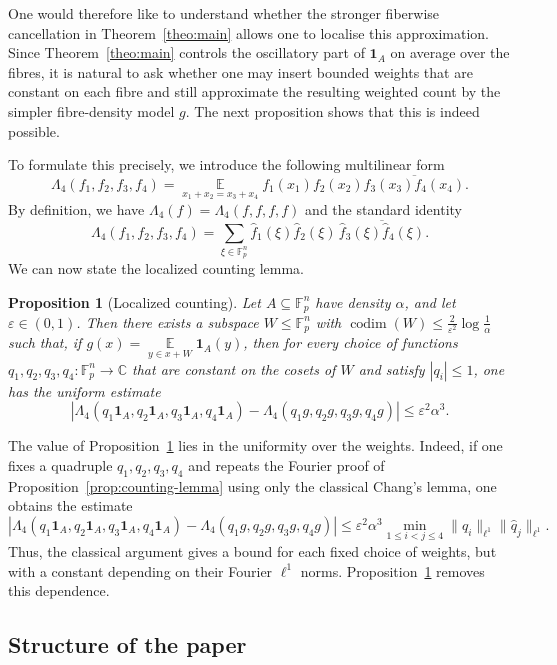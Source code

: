 \documentclass[11pt,reqno]{amsart}
\theoremstyle{plain}
\newtheorem{prop}[thm]{Proposition}
\theoremstyle{remark}
\begin{document}
One would therefore like to understand whether the stronger fiberwise cancellation in Theorem~\ref{theo:main} allows one to localise this approximation. Since Theorem~\ref{theo:main} controls the oscillatory part of $\mathbf 1_A$ on average over the fibres, it is natural to ask whether one may insert bounded weights that are constant on each fibre and still approximate the resulting weighted count by the simpler fibre-density model $g$. The next proposition shows that this is indeed possible.

To formulate this precisely, we introduce the following multilinear form
$$
\Lambda_4(f_1,f_2,f_3,f_4)
=
\mathop{\mathbb E}\limits_{x_1+x_2=x_3+x_4}
f_1(x_1)f_2(x_2)\overline{f_3(x_3)f_4(x_4)}.
$$
By definition, we have  $\Lambda_4(f)=\Lambda_4(f,f,f,f)$ and the standard identity
$$
\Lambda_4(f_1,f_2,f_3,f_4)
=
\sum_{\xi\in\mathbb F_p^n}
\widehat f_1(\xi)\widehat f_2(\xi)\,
\overline{\widehat f_3(\xi)\widehat f_4(\xi)}.
$$
We can now state the localized counting lemma.
\begin{prop}[Localized counting]\label{prop:localized-counting}
Let $A\subseteq \mathbb F_p^n$ have density $\alpha$, and let $\varepsilon\in(0,1)$. Then there exists a subspace $W\le \mathbb F_p^n$ with $\operatorname{codim}(W)\le \frac{2}{\varepsilon^2}\log\frac{1}{\alpha}$ such that, if $g(x)=\mathop{\mathbb E}\limits_{y\in x+W}\mathbf 1_A(y)$, then for every choice of functions $q_1,q_2,q_3,q_4:\mathbb F_p^n\to\mathbb C$ that are constant on the cosets of $W$ and satisfy $|q_i|\le 1$, one has the uniform estimate
$$
\left|
\Lambda_4(q_1\mathbf 1_A,q_2\mathbf 1_A,q_3\mathbf 1_A,q_4\mathbf 1_A)
-
\Lambda_4(q_1g,q_2g,q_3g,q_4g)
\right|
\le \varepsilon^2\alpha^3.
$$
\end{prop}
The value of Proposition~\ref{prop:localized-counting} lies in the uniformity over the weights. Indeed, if one fixes a quadruple $q_1,q_2,q_3,q_4$ and repeats the Fourier proof of Proposition~\ref{prop:counting-lemma} using only the classical Chang's lemma, one obtains the estimate
$$
\left|
\Lambda_4(q_1\mathbf 1_A,q_2\mathbf 1_A,q_3\mathbf 1_A,q_4\mathbf 1_A)
-
\Lambda_4(q_1g,q_2g,q_3g,q_4g)
\right|
\le
\varepsilon^2\alpha^3
\min_{1\le i<j\le 4}
\|\widehat q_i\|_{\ell^1}\|\widehat q_j\|_{\ell^1}.
$$
Thus, the classical argument gives a bound for each fixed choice of weights, but with a constant depending on their Fourier $\ell^1$ norms. Proposition~\ref{prop:localized-counting} removes this dependence.


\subsection{Structure of the paper}
\end{document}
